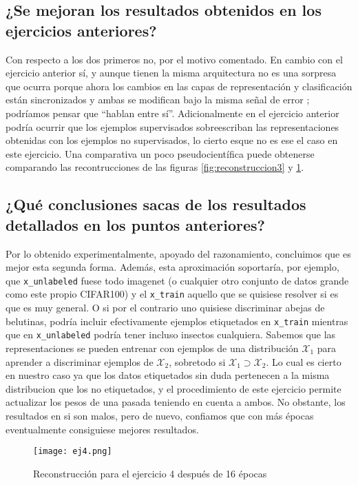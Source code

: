 \documentclass{article}
\begin{document}
\subsection{¿Se mejoran los resultados obtenidos en los ejercicios anteriores?}
Con respecto a los dos primeros no, por el motivo comentado. En cambio con el ejercicio anterior sí, y aunque tienen la misma arquitectura no es una sorpresa que ocurra porque ahora los cambios en las capas de representación y clasificación están sincronizados y ambas se modifican bajo la misma señal de error \cite{rumelhart1986learning}; podríamos pensar que ``hablan entre sí''. Adicionalmente en el ejercicio anterior podría ocurrir que los ejemplos supervisados sobreescriban las representaciones obtenidas con los ejemplos no supervisados, lo cierto esque no es ese el caso en este ejercicio. Una comparativa un poco pseudocientífica puede obtenerse comparando las recontrucciones de las figuras \ref{fig:reconstruccion3} y \ref{fig:ej4}.
\subsection{¿Qué conclusiones sacas de los resultados detallados en los puntos anteriores?}

Por lo obtenido experimentalmente, apoyado del razonamiento, concluimos que es mejor esta segunda forma. Además, esta aproximación soportaría, por ejemplo, que \texttt{x\_unlabeled} fuese todo imagenet (o cualquier otro conjunto de datos grande como este propio CIFAR100) y el \texttt{x\_train} aquello que se quisiese resolver si es que es muy general. O si por el contrario uno quisiese discriminar abejas de belutinas, podría incluir efectivamente ejemplos etiquetados en  \texttt{x\_train} mientras que en \texttt{x\_unlabeled} podría tener incluso insectos cualquiera. Sabemos \cite{yosinski2014transferable} que las representaciones se pueden entrenar con ejemplos de una distribución $\mathcal{X}_1$ para aprender a discriminar ejemplos de  $\mathcal{X}_2$, sobretodo si $\mathcal{X}_1 \supset \mathcal{X}_2$. Lo cual es cierto en nuestro caso ya que los datos etiquetados sin duda pertenecen a la misma distribucion que los no etiquetados, y el procedimiento de este ejercicio permite actualizar los pesos de una pasada teniendo en cuenta a ambos. No obstante, los resultados en si son malos, pero de nuevo, confiamos que con más épocas eventualmente consiguiese mejores resultados. 

\begin{figure}
    \centering
    \texttt{[image: ej4.png]}
    \caption{Reconstrucción para el ejercicio 4 después de 16 épocas}
    \label{fig:ej4}
\end{figure}
\end{document}
